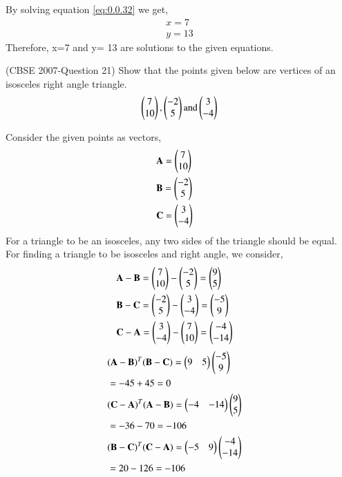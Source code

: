 \documentclass[journal,12pt,twocolumn]{IEEEtran}
\begin{document}
By solving equation \eqref{eq:0.0.32} we get,
\begin{align}
&x=7&\\
&y= 13&
\end{align}
Therefore, x=7 and y= 13 are solutions to the given equations. 
\bigskip
\item (CBSE 2007-Question 21) Show that the points given below are vertices of an isosceles right angle triangle.
\begin{align}
\begin{pmatrix}7\\10\end{pmatrix}, \begin{pmatrix}-2\\5\end{pmatrix} \text{and} \begin{pmatrix}3\\-4\end{pmatrix}
\end{align}

\solution Consider the given points as vectors,
\begin{align}
&\mathbf{A}= \begin{pmatrix}7\\10\end{pmatrix}&\\
&\mathbf{B}=\begin{pmatrix}-2\\5\end{pmatrix}&\\
&\mathbf{C}=\begin{pmatrix}3\\-4\end{pmatrix}&
\end{align}
For a triangle to be an isosceles, any two sides of the triangle should be equal.
For finding a triangle to be isosceles and right angle, we consider,
\begin{align}
&\mathbf{A-B}= \begin{pmatrix}7\\10\end{pmatrix} - \begin{pmatrix}-2\\5\end{pmatrix} = \begin{pmatrix}9\\5\end{pmatrix}&\\
&\mathbf{B-C}= \begin{pmatrix}-2\\5\end{pmatrix} - \begin{pmatrix}3\\-4\end{pmatrix} = \begin{pmatrix}-5 \\ 9\end{pmatrix}&\\
&\mathbf{C-A}=  \begin{pmatrix}3\\-4\end{pmatrix} - \begin{pmatrix}7\\10\end{pmatrix} = \begin{pmatrix}-4\\ -14\end{pmatrix}&
\end{align}
\begin{align}
&\mathbf{(A-B)}^T\mathbf{(B-C)} = \begin{pmatrix}9&5\end{pmatrix}\begin{pmatrix}-5\\9\end{pmatrix} &\\&= -45+45 = 0 \label{eq:0.0.43}&\\
& \mathbf{(C-A)}^T\mathbf{(A-B)} = \begin{pmatrix}-4&-14\end{pmatrix}\begin{pmatrix}9\\5\end{pmatrix}&\\& = -36-70 = -106 \label{eq:0.0.45}&\\
 &\mathbf{(B-C)}^T\mathbf{(C-A)} = \begin{pmatrix}-5&9\end{pmatrix}\begin{pmatrix}-4\\-14\end{pmatrix}&\\& = 20-126 = -106 \label{eq:0.0.47}&
\end{align}
\end{document}
